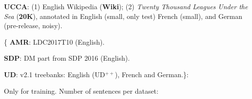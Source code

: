 \documentclass[a0,portrait]{a0poster}
\begin{document}
\begin{multicols}{2}
\begin{itemize*}
\item [\textbf{\color{Indigo} UCCA}:] \color{Indigo} (1) English Wikipedia (\textbf{Wiki});
(2) \textit{Twenty Thousand Leagues Under the Sea} (\textbf{20K}),
annotated in English (small, only test) French (small), and German
(pre-release, noisy).
\item [\{\textbf{\color{DarkGreen} AMR}:] \color{DarkGreen} LDC2017T10 (English).
\item [\textbf{\color{DarkRed} SDP}:] \color{DarkRed} DM part from SDP 2016 (English).
\item [\textbf{\color{DarkBlue} UD}:] {\color{DarkBlue} v2.1 treebanks:
English (UD$^{++}$), French and German.}\}:
\end{itemize*}
Only for training.
\hfill Number of sentences per dataset:


\end{multicols}
\end{document}

